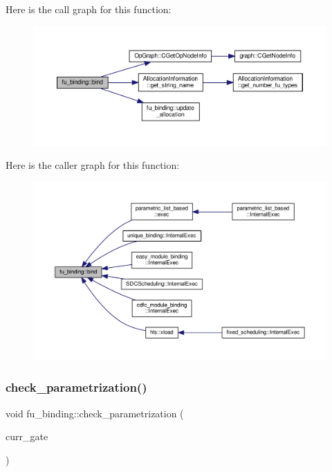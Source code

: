 Here is the call graph for this function\+:
\nopagebreak
\begin{figure}[H]
\begin{center}
\leavevmode
\includegraphics[width=350pt]{d8/d04/classfu__binding_af75163b4c31b19bb12cc240464978692_cgraph}
\end{center}
\end{figure}
Here is the caller graph for this function\+:
\nopagebreak
\begin{figure}[H]
\begin{center}
\leavevmode
\includegraphics[width=350pt]{d8/d04/classfu__binding_af75163b4c31b19bb12cc240464978692_icgraph}
\end{center}
\end{figure}
\mbox{\label{classfu__binding_acbc4082d95a97e8ce9ca88a46a72999e}} 
\subsubsection{\texorpdfstring{check\+\_\+parametrization()}{check\_parametrization()}}
{\footnotesize\ttfamily void fu\+\_\+binding\+::check\+\_\+parametrization (\begin{DoxyParamCaption}\item[{\hyperlink{structural__objects_8hpp_a8ea5f8cc50ab8f4c31e2751074ff60b2}{structural\+\_\+object\+Ref}}]{curr\+\_\+gate }\end{DoxyParamCaption})\hspace{0.3cm}{\ttfamily [protected]}}



